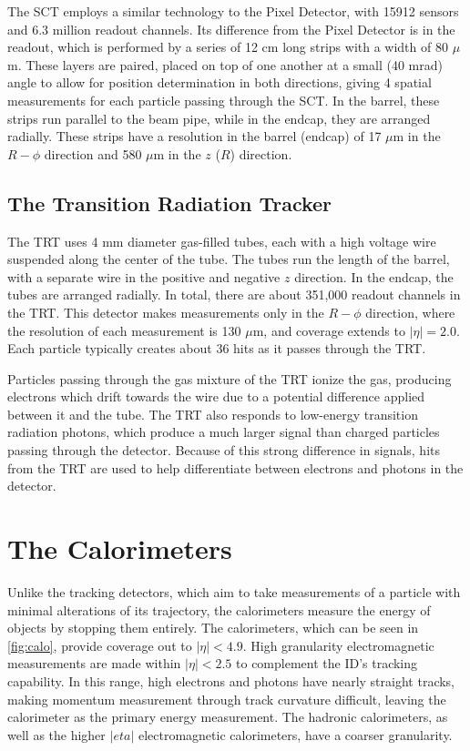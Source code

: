 The \ac{SCT} employs a similar technology to the Pixel Detector, with 15912 sensors and 6.3 million readout channels. Its difference from the Pixel Detector is in the readout, which is performed by a series of 12 cm long strips with a width of 80 $\mu$m. These layers are paired, placed on top of one another at a small (40 mrad) angle to allow for position determination in both directions, giving 4 spatial measurements for each particle passing through the \ac{SCT}. In the barrel, these strips run parallel to the beam pipe, while in the endcap, they are arranged radially. These strips have a resolution in the barrel (endcap) of 17 $\mu$m in the $R-\phi$ direction and 580 $\mu$m in the $z$ ($R$) direction. 

\subsection{The Transition Radiation Tracker}

The \ac{TRT} uses 4 mm diameter gas-filled tubes, each with a high voltage wire suspended along the center of the tube. The tubes run the length of the barrel, with a separate wire in the positive and negative $z$ direction. In the endcap, the tubes are arranged radially. In total, there are about 351,000 readout channels in the \ac{TRT}. This detector makes measurements only in the $R-\phi$ direction, where the resolution of each measurement is 130 $\mu$m, and coverage extends to $|\eta|=2.0$. Each particle typically creates about 36 hits as it passes through the \ac{TRT}. 

Particles passing through the gas mixture of the \ac{TRT} ionize the gas, producing electrons which drift towards the wire due to a potential difference applied between it and the tube. The \ac{TRT} also responds to low-energy transition radiation photons, which produce a much larger signal than charged particles passing through the detector. Because of this strong difference in signals, hits from the \ac{TRT} are used to help differentiate between electrons and photons in the detector.

\section{The Calorimeters}
\label{sec:Calo}

Unlike the tracking detectors, which aim to take measurements of a particle with minimal alterations of its trajectory, the calorimeters measure the energy of objects by stopping them entirely. The calorimeters, which can be seen in \autoref{fig:calo}, provide coverage out to $|\eta| < 4.9$. High granularity electromagnetic measurements are made within $|\eta| < 2.5$ to complement the \ac{ID}'s tracking capability. In this range, high \pt electrons and photons have nearly straight tracks, making momentum measurement through track curvature difficult, leaving the calorimeter as the primary energy measurement. The hadronic calorimeters, as well as the higher $|eta|$ electromagnetic calorimeters, have a coarser granularity. 

